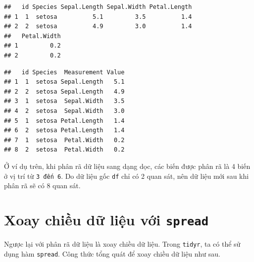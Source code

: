 \documentclass[]{krantz}
\makeatletter
\newenvironment{Shaded}{\begin{snugshade}}{\end{snugshade}}
\newcommand{\CommentTok}[1]{\textcolor[rgb]{0.37,0.37,0.37}{\textit{#1}}}
\newcommand{\DataTypeTok}[1]{\textcolor[rgb]{0.27,0.27,0.27}{#1}}
\newcommand{\DecValTok}[1]{\textcolor[rgb]{0.06,0.06,0.06}{#1}}
\newcommand{\KeywordTok}[1]{\textcolor[rgb]{0.27,0.27,0.27}{\textbf{#1}}}
\newcommand{\NormalTok}[1]{#1}
\newcommand{\OperatorTok}[1]{\textcolor[rgb]{0.43,0.43,0.43}{\textbf{#1}}}
\newcommand{\StringTok}[1]{\textcolor[rgb]{0.5,0.5,0.5}{#1}}
\newenvironment{kframe}{%
\medskip{}
\setlength{\fboxsep}{.8em}
 \def\at@end@of@kframe{}%
 \ifinner\ifhmode%
  \def\at@end@of@kframe{\end{minipage}}%
  \begin{minipage}{\columnwidth}%
 \fi\fi%
 \def\FrameCommand##1{\hskip\@totalleftmargin \hskip-\fboxsep
 \colorbox{shadecolor}{##1}\hskip-\fboxsep
     \hskip-\linewidth \hskip-\@totalleftmargin \hskip\columnwidth}%
 \MakeFramed {\advance\hsize-\width
   \@totalleftmargin\z@ \linewidth\hsize
   \@setminipage}}%
 {\par\unskip\endMakeFramed%
 \at@end@of@kframe}
\renewenvironment{Shaded}{\begin{kframe}}{\end{kframe}}
\renewenvironment{Shaded}{\begin{snugshade}}{\end{snugshade}}
\renewcommand{\CommentTok}[1]{\textcolor[rgb]{0.56,0.35,0.01}{\textit{#1}}}
\renewcommand{\DataTypeTok}[1]{\textcolor[rgb]{0.13,0.29,0.53}{#1}}
\renewcommand{\DecValTok}[1]{\textcolor[rgb]{0.00,0.00,0.81}{#1}}
\renewcommand{\KeywordTok}[1]{\textcolor[rgb]{0.13,0.29,0.53}{\textbf{#1}}}
\renewcommand{\NormalTok}[1]{#1}
\renewcommand{\OperatorTok}[1]{\textcolor[rgb]{0.81,0.36,0.00}{\textbf{#1}}}
\renewcommand{\StringTok}[1]{\textcolor[rgb]{0.31,0.60,0.02}{#1}}
\theoremstyle{definition}
\theoremstyle{definition}
\theoremstyle{definition}
\theoremstyle{remark}
\makeatother
\begin{document}
\begin{verbatim}
##   id Species Sepal.Length Sepal.Width Petal.Length
## 1  1  setosa          5.1         3.5          1.4
## 2  2  setosa          4.9         3.0          1.4
##   Petal.Width
## 1         0.2
## 2         0.2
\end{verbatim}

\begin{Shaded}
\end{Shaded}

\begin{verbatim}
##   id Species  Measurement Value
## 1  1  setosa Sepal.Length   5.1
## 2  2  setosa Sepal.Length   4.9
## 3  1  setosa  Sepal.Width   3.5
## 4  2  setosa  Sepal.Width   3.0
## 5  1  setosa Petal.Length   1.4
## 6  2  setosa Petal.Length   1.4
## 7  1  setosa  Petal.Width   0.2
## 8  2  setosa  Petal.Width   0.2
\end{verbatim}

Ở ví dụ trên, khi phân rã dữ liệu sang dạng dọc, các biến được phân rã
là 4 biến ở vị trí từ \texttt{3\ đến\ 6}. Do dữ liệu gốc \texttt{df} chỉ
có 2 quan sát, nên dữ liệu mới sau khi phân rã sẽ có 8 quan sát.

\hypertarget{xoay-chiu-d-liu-vi-spread}{%
\section{\texorpdfstring{Xoay chiều dữ liệu với
\texttt{spread}}{Xoay chiều dữ liệu với spread}}\label{xoay-chiu-d-liu-vi-spread}}

Ngược lại với phân rã dữ liệu là xoay chiều dữ liệu. Trong
\texttt{tidyr}, ta có thể sử dụng hàm \texttt{spread}. Công thức tổng
quát để xoay chiều dữ liệu như sau.

\begin{Shaded}
\end{Shaded}
\end{document}
